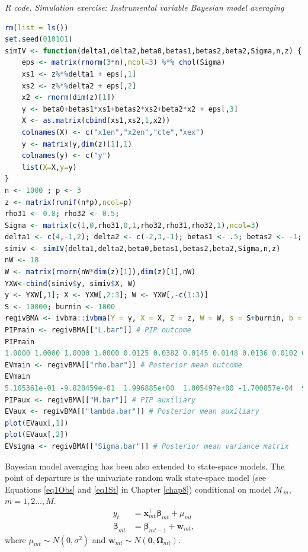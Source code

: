 \begin{tcolorbox}[enhanced,width=4.67in,center upper,
	fontupper=\large\bfseries,drop shadow southwest,sharp corners]
	\textit{R code. Simulation exercise: Instrumental variable Bayesian model averaging}
	\begin{VF}
		\begin{lstlisting}[language=R]
rm(list = ls())
set.seed(010101)
simIV <- function(delta1,delta2,beta0,betas1,betas2,beta2,Sigma,n,z) {
	eps <- matrix(rnorm(3*n),ncol=3) %*% chol(Sigma)
	xs1 <- z%*%delta1 + eps[,1]
	xs2 <- z%*%delta2 + eps[,2]
	x2 <- rnorm(dim(z)[1])
	y <- beta0+betas1*xs1+betas2*xs2+beta2*x2 + eps[,3]
	X <- as.matrix(cbind(xs1,xs2,1,x2)) 
	colnames(X) <- c("x1en","x2en","cte","xex")
	y <- matrix(y,dim(z)[1],1)
	colnames(y) <- c("y")
	list(X=X,y=y)
}
n <- 1000 ; p <- 3 
z <- matrix(runif(n*p),ncol=p)
rho31 <- 0.8; rho32 <- 0.5;
Sigma <- matrix(c(1,0,rho31,0,1,rho32,rho31,rho32,1),ncol=3)
delta1 <- c(4,-1,2); delta2 <- c(-2,3,-1); betas1 <- .5; betas2 <- -1; beta2 <- 1; beta0 <- 2
simiv <- simIV(delta1,delta2,beta0,betas1,betas2,beta2,Sigma,n,z)
nW <- 18
W <- matrix(rnorm(nW*dim(z)[1]),dim(z)[1],nW)
YXW<-cbind(simiv$y, simiv$X, W)
y <- YXW[,1]; X <- YXW[,2:3]; W <- YXW[,-c(1:3)]
S <- 10000; burnin <- 1000
regivBMA <- ivbma::ivbma(Y = y, X = X, Z = z, W = W, s = S+burnin, b = burnin, odens = S, print.every = round(S/10), run.diagnostics = FALSE)
PIPmain <- regivBMA[["L.bar"]] # PIP outcome
PIPmain
1.0000 1.0000 1.0000 1.0000 0.0125 0.0382 0.0145 0.0148 0.0136 0.0102 0.0070 0.0527 0.0014 0.0077 0.0211 0.0081 0.0047 0.0141 0.0028 0.0063 0.0072 0.0220
EVmain <- regivBMA[["rho.bar"]] # Posterior mean outcome
EVmain
5.105361e-01 -9.828459e-01  1.996885e+00  1.005497e+00 -1.700857e-04  9.946613e-04  1.086717e-04 -1.448951e-04  1.532812e-04  1.356334e-04 -6.027285e-05  9.119699e-04 -1.581408e-05  1.050517e-04 2.488002e-04 -6.229493e-05  4.292825e-05  3.371366e-05  5.345760e-06  5.933764e-05 5.066236e-05 1.516718e-04
PIPaux <- regivBMA[["M.bar"]] # PIP auxiliary
EVaux <- regivBMA[["lambda.bar"]] # Posterior mean auxiliary
plot(EVaux[,1])
plot(EVaux[,2])
EVsigma <- regivBMA[["Sigma.bar"]] # Posterior mean variance matrix
\end{lstlisting}
\end{VF}
\end{tcolorbox}

Bayesian model averaging has been also extended to state-space models. The point of departure is the univariate random walk state-space model (see Equations \ref{eq1Obs} and \ref{eq1St} in Chapter \ref{chap8}) conditional on model $\mathcal{M}_m$, $m=1,2\dots,M$. 
\begin{align}
	y_t&=\bm{x}_{mt}^{\top}\bm{\beta}_{mt}+\mu_{mt}\\
	\bm{\beta}_{mt}&=\bm{\beta}_{mt-1}+\bm{w}_{mt},
\end{align}
where $\mu_{mt}\sim N(0,\sigma^2)$ and $\bm{w}_{mt}\sim N(\bm{0},\bm{\Omega}_{mt})$.

